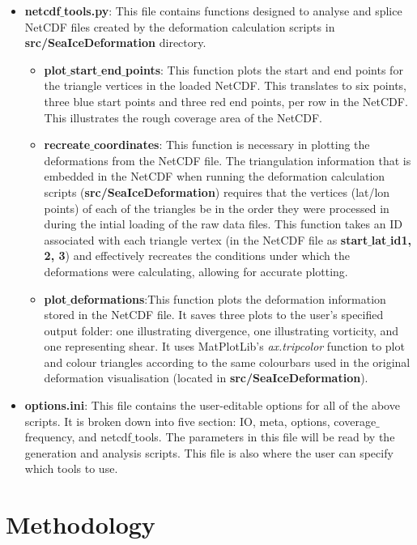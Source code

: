 \documentclass{article}
\begin{document}
\begin{itemize}
\begin{itemize}
            \end{itemize}
            \item \textbf{netcdf$\_$tools.py}: This file contains functions designed to analyse and splice NetCDF files created by the deformation calculation scripts in \textbf{src/SeaIceDeformation} directory.
            \begin{itemize}
                \item \textbf{plot$\_$start$\_$end$\_$points}: This function plots the start and end points for the triangle vertices in the loaded NetCDF. This translates to six points, three blue start points and three red end points, per row in the NetCDF. This illustrates the rough coverage area of the NetCDF.
                \item \textbf{recreate$\_$coordinates}: This function is necessary in plotting the deformations from the NetCDF file. The triangulation information that is embedded in the NetCDF when running the deformation calculation scripts (\textbf{src/SeaIceDeformation}) requires that the vertices (lat/lon points) of each of the triangles be in the order they were processed in during the intial loading of the raw data files. This function takes an ID associated with each triangle vertex (in the NetCDF file as \textbf{start$\_$lat$\_$id1, 2, 3}) and effectively recreates the conditions under which the deformations were calculating, allowing for accurate plotting.
                \item \textbf{plot$\_$deformations}:This function  plots the deformation information stored in the NetCDF file. It saves three plots to the user's specified output folder: one illustrating divergence, one illustrating vorticity, and one representing shear. It uses MatPlotLib's \textit{ax.tripcolor} function to plot and colour triangles according to the same colourbars used in the original deformation visualisation (located in \textbf{src/SeaIceDeformation}).
            \end{itemize}
            \item \textbf{options.ini}: This file contains the user-editable options for all of the above scripts. It is broken down into five section: IO, meta, options, coverage$\_$frequency, and netcdf$\_$tools. The parameters in this file will be read by the generation and analysis scripts. This file is also where the user can specify which tools to use.
        \end{itemize}

\section{Methodology}
\end{document}
